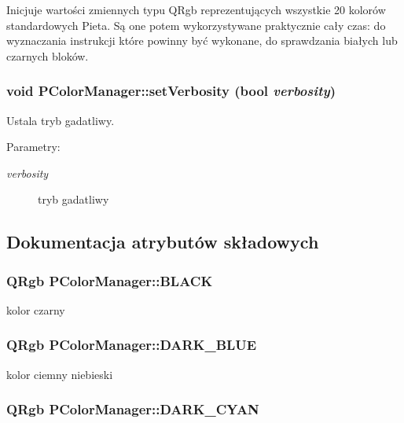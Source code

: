 Inicjuje wartości zmiennych typu QRgb reprezentujących wszystkie 20 kolorów standardowych Pieta. Są one potem wykorzystywane praktycznie cały czas: do wyznaczania instrukcji które powinny być wykonane, do sprawdzania białych lub czarnych bloków. \hypertarget{classPColorManager_ee267bb2056457f73dcf1115e7d3c973}{
\subsubsection[{setVerbosity}]{\setlength{\rightskip}{0pt plus 5cm}void PColorManager::setVerbosity (bool {\em verbosity})}}
\label{classPColorManager_ee267bb2056457f73dcf1115e7d3c973}


Ustala tryb gadatliwy. \begin{Desc}
\item[Parametry:]
\begin{description}
\item[{\em verbosity}]tryb gadatliwy \end{description}
\end{Desc}


\subsection{Dokumentacja atrybutów składowych}
\hypertarget{classPColorManager_13278cb96706ed743a3f86a6cf4232cb}{
\subsubsection[{BLACK}]{\setlength{\rightskip}{0pt plus 5cm}QRgb {\bf PColorManager::BLACK}}}
\label{classPColorManager_13278cb96706ed743a3f86a6cf4232cb}


kolor czarny \hypertarget{classPColorManager_2d7a0c5c065fa5b662cb53748e5347ed}{
\subsubsection[{DARK\_\-BLUE}]{\setlength{\rightskip}{0pt plus 5cm}QRgb {\bf PColorManager::DARK\_\-BLUE}}}
\label{classPColorManager_2d7a0c5c065fa5b662cb53748e5347ed}


kolor ciemny niebieski \hypertarget{classPColorManager_d7dcde24002d9fa0ee9600d37720a930}{
\subsubsection[{DARK\_\-CYAN}]{\setlength{\rightskip}{0pt plus 5cm}QRgb {\bf PColorManager::DARK\_\-CYAN}}}
\label{classPColorManager_d7dcde24002d9fa0ee9600d37720a930}


